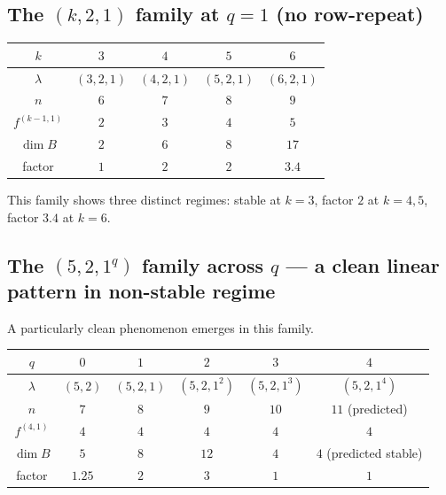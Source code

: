 \documentclass[11pt]{article}
\theoremstyle{definition}
\begin{document}
\subsection{The $(k, 2, 1)$ family at $q = 1$ (no row-repeat)}

\begin{center}
\begin{tabular}{c|cccc}
\toprule
$k$        & $3$ & $4$ & $5$ & $6$ \\
\midrule
$\lambda$  & $(3,2,1)$ & $(4,2,1)$ & $(5,2,1)$ & $(6,2,1)$ \\
$n$        & $6$       & $7$       & $8$       & $9$       \\
$f^{(k-1, 1)}$ & $2$   & $3$       & $4$       & $5$       \\
$\dim B$   & $2$       & $6$       & $8$       & $17$      \\
factor     & $1$       & $2$       & $2$       & $3.4$     \\
\bottomrule
\end{tabular}
\end{center}

This family shows three distinct regimes: stable at $k = 3$, factor
$2$ at $k = 4, 5$, factor $3.4$ at $k = 6$.

\subsection{The $(5, 2, 1^q)$ family across $q$ --- a clean linear pattern in non-stable regime}

A particularly clean phenomenon emerges in this family.

\begin{center}
\begin{tabular}{c|ccccc}
\toprule
$q$         & $0$ & $1$ & $2$ & $3$ & $4$ \\
\midrule
$\lambda$   & $(5,2)$ & $(5,2,1)$ & $(5,2,1^2)$ & $(5,2,1^3)$ & $(5,2,1^4)$ \\
$n$         & $7$     & $8$       & $9$         & $10$        & $11$ (predicted) \\
$f^{(4, 1)}$ & $4$    & $4$       & $4$         & $4$         & $4$ \\
$\dim B$    & $5$     & $8$       & $12$        & $4$         & $4$ (predicted stable) \\
factor      & $1.25$  & $2$       & $3$         & $1$         & $1$ \\
\bottomrule
\end{tabular}
\end{center}
\end{document}

